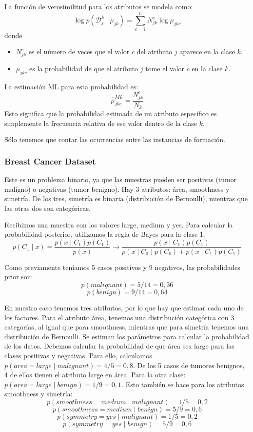 La función de verosimilitud para los atributos se modela como:
$$\log p(\mathcal{D}^k_j \mid \mu_{jk}) = \sum^C_{c = 1} N^c_{jk} \log \mu_{jkc}$$
donde
\begin{itemize}
\item $ N^c_{jk}$ es el número de veces que el valor $c$ del atributo $j$ aparece en la clase $k$.
\item $\mu_{jkc}$ es la probabilidad de que el atributo $j$ tome el valor $c$ en la clase $k$.
\end{itemize}

La estimación ML para esta probabilidad es:
$$\hat{\mu}^{ML}_{jkc} = \frac{N^c_{jk}}{N_k}$$
Esto significa que la probabilidad estimada de un atributo específico es simplemente la frecuencia relativa de ese valor dentro de la clase $k$.

Sólo tenemos que contar las ocurrencias entre las instancias de formación.

\subsubsection{Breast Cancer Dataset}
Este es un problema binario, ya que las muestras pueden ser positivas (tumor maligno) o negativas (tumor benigno). Hay 3 atributos: área, smoothness y simetría. De los tres, simetría es binaria (distribución de Bernoulli), mientras que las otras dos son categóricas.

Recibimos una muestra con los valores large, medium y yes. Para calcular la probabilidad posterior, utilizamos la regla de Bayes para la clase 1:
$$p(C_1 \mid x) = \frac{p(x \mid C_1) p(C_1)}{p(x)} \rightarrow \frac{p(x \mid C_1) p(C_1)}{p(x \mid C_0) p(C_0) + p(x \mid C_1) p(C_1)}$$

Como previamente teníamos 5 casos positivos y 9 negativos, las probabilidades prior son:
$$p(malignant) = 5/14 = 0,36$$
$$p(benign) = 9/14 = 0,64$$

En nuestro caso tenemos tres atributos, por lo que hay que estimar cada uno de los factores. Para el atributo área, tenemos una distribución categórica con 3 categorías, al igual que para smoothness, mientras que para simetría tenemos una distribución de Bernoulli. Se estiman los parámetros para calcular la probabilidad de los datos. Debemos calcular la probabilidad de que área sea large para las clases positivas y negativas. Para ello, calculamos $p(area = large \mid malignant) = 4/5 = 0,8$. De los 5 casos de tumores benignos, 4 de ellos tienen el atributo large en área. Para la otra clase: $p(area = large \mid benign) = 1/9 = 0,1$. Esto también se hace para los atributos smoothness y simetría:
   \
$$p(smoothness = medium \mid malignant) = 1/5 = 0,2$$
$$p(smoothness = medium \mid benign) = 5/9 = 0,6$$
$$p(symmetry = yes \mid malignant) = 1/5 = 0,2$$
$$p(symmetry = yes \mid benign) = 5/9 = 0,6$$

